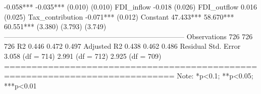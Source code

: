                 -0.058***        -0.035***                                                     (0.010)          (0.010)                                                                                    FDI_inflow                                                        -0.018                                                                       (0.026)                                                                                    FDI_outflow                                                       0.016                                                                        (0.025)                                                                                    Tax_contribution                                                -0.071***                                                                      (0.012)                                                                                    Constant                      47.433***        58.670***        60.551***                                    (3.380)          (3.793)          (3.749)                                                                                    ----------------------------------------------------------------------------- Observations                     726              726              726        R2                              0.446            0.472            0.497       Adjusted R2                     0.438            0.462            0.486       Residual Std. Error        3.058 (df = 714) 2.991 (df = 712) 2.925 (df = 709) ============================================================================= Note:                                             *p<0.1; **p<0.05; ***p<0.01
